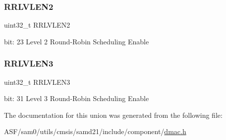 \subsubsection{\texorpdfstring{RRLVLEN2}{RRLVLEN2}}
{\footnotesize\ttfamily uint32\+\_\+t R\+R\+L\+V\+L\+E\+N2}

bit\+: 23 Level 2 Round-\/\+Robin Scheduling Enable \mbox{\label{union_d_m_a_c___p_r_i_c_t_r_l0___type_afcf5b5938a12e866c69030cb74dd7e67}} 
\subsubsection{\texorpdfstring{RRLVLEN3}{RRLVLEN3}}
{\footnotesize\ttfamily uint32\+\_\+t R\+R\+L\+V\+L\+E\+N3}

bit\+: 31 Level 3 Round-\/\+Robin Scheduling Enable 

The documentation for this union was generated from the following file\+:\begin{DoxyCompactItemize}
\item 
A\+S\+F/sam0/utils/cmsis/samd21/include/component/\mbox{\hyperlink{component_2dmac_8h}{dmac.\+h}}\end{DoxyCompactItemize}
